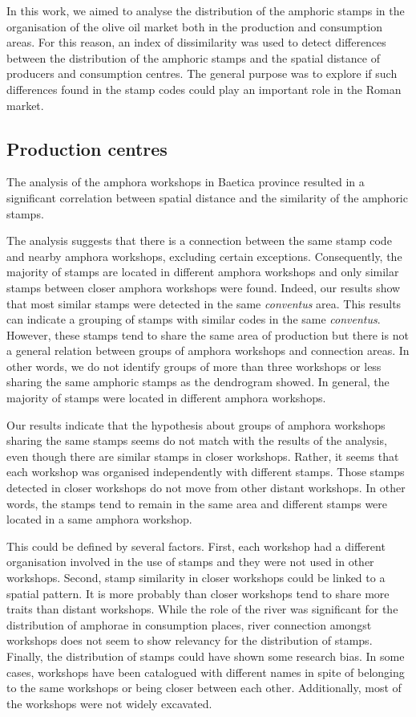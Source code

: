 \documentclass[review]{elsarticle}
\begin{document}

In this work, we aimed to analyse the distribution of the amphoric stamps in the organisation of the olive oil market both in the production and consumption areas. For this reason, an index of dissimilarity was used to detect differences between the distribution of the amphoric stamps and the spatial distance of producers and consumption centres. The general purpose was to explore if such differences found in the stamp codes could play an important role in the Roman market.  

\subsection{Production centres}

The analysis of the amphora workshops in Baetica province resulted in a significant correlation between spatial distance and the similarity of the amphoric stamps. 

The analysis suggests that there is  a connection between the same stamp code and nearby amphora workshops, excluding certain exceptions. Consequently, the majority of stamps are located in different amphora workshops and only similar stamps between closer amphora workshops were found. Indeed, our results show that most similar stamps were detected in the same \textit{conventus} area. This results can indicate a grouping of stamps with similar codes in the same \textit{conventus}. However, these stamps tend to share the same area of production but there is not a general relation between groups of amphora workshops and connection areas. In other words, we do not identify groups of more than three workshops or less sharing the same amphoric stamps as the dendrogram showed. In general, the majority of stamps were located in different amphora workshops. 


Our results indicate that the hypothesis about groups of amphora workshops sharing the same stamps seems do not match with the results of the analysis, even though there are similar stamps in closer workshops. Rather, it seems that each workshop was organised independently with different stamps. Those stamps detected in closer workshops do not move from other distant workshops. In other words, the stamps tend to remain in the same area and different stamps were located in a same amphora workshop. 

This could be defined by several factors. First, each workshop had a different organisation involved in the use of stamps and they were not used in other workshops. Second, stamp similarity in closer workshops could be linked to a spatial pattern. It is more probably than closer workshops tend to share more traits than distant workshops. While the role of the river was significant for the distribution of amphorae in consumption places, river connection amongst workshops does not seem to show relevancy for the distribution of stamps. Finally, the distribution of stamps could have shown some research bias. In some cases, workshops have been catalogued with different names in spite of belonging to the same workshops or being closer between each other. Additionally, most of the workshops were not widely excavated. 
\end{document}
